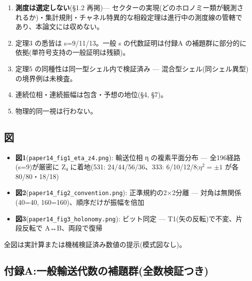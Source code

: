\documentclass[
]{ltjsarticle}
\providecommand{\tightlist}{%
  \setlength{\itemsep}{0pt}\setlength{\parskip}{0pt}}
\begin{document}
\begin{enumerate}
\def\labelenumi{\arabic{enumi}.}
\tightlist
\item
  \textbf{測度は選定しない}(§1.2 再掲)---
  セクターの実現(どのホロノミー類が観測されるか)・集計規則・チャネル特異的な相殺定理は進行中の測度線の管轄であり、本論文には収めない。
\item
  定理3 の悉皆は s=9/11/13。一般 s の代数証明は付録A
  の補題群に部分的に依拠(単符号支持の一般証明は残額)。
\item
  定理5 の同種性は同一型シェル内で検証済み ---
  混合型シェル(同シェル異型)の境界例は未検査。
\item
  連続位相・連続振幅は包含・予想の地位(§4, §7)。
\item
  物理的同一視は行わない。
\end{enumerate}

\subsection{図}\label{ux56f3}

\begin{itemize}
\tightlist
\item
  \textbf{図1}(\texttt{paper14\_fig1\_eta\_z4.png}): 輸送位相 η
  の複素平面分布 --- 全196経路(s=9)が厳密に Z₄ に着地(531:
  24/44/56/36、333: 6/10/12/8;\(\eta^2=\pm1\) が各80/80・18/18)
\item
  \textbf{図2}(\texttt{paper14\_fig2\_convention.png}):
  正準規約の2×2分離 --- 対角は無関係(40=40,
  160=160)、順序だけが振幅を倍加
\item
  \textbf{図3}(\texttt{paper14\_fig3\_holonomy.png}): ビット同定 ---
  T1(矢の反転)で不変、片段反転で A↔B、両段で復帰
\end{itemize}

全図は実計算または機械検証済み数値の提示(模式図なし)。

\subsection{付録A:一般輸送代数の補題群(全数検証つき)}\label{ux4ed8ux9332aux4e00ux822cux8f38ux9001ux4ee3ux6570ux306eux88dcux984cux7fa4ux5168ux6570ux691cux8a3cux3064ux304d}
\end{document}
